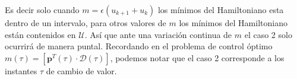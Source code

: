 Es decir solo cuando  $m = \epsilon(u_{k+1}+u_k)$ los mínimos del Hamiltoniano esta dentro de un intervalo, para otros valores de $m$ los mínimos del Hamiltoniano están contenidos en $\mathcal{U}$. Así que ante una variación continua de $m$ el caso 2 solo ocurrirá de manera puntal. Recordando en el problema de control óptimo $m(\tau) = [\bm{p}^T(\tau) \cdot \bm{\mathcal{D}}(\tau)]$, podemos notar que el caso 2 corresponde a los instantes $\tau$ de cambio de valor.